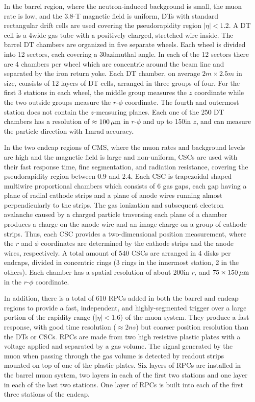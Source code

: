 In the barrel region, where the neutron-induced background is small, the muon rate is low, and the 3.8-T magnetic field is uniform, DTs with standard rectangular drift cells are used covering the pseudorapidity region $|\eta| < 1.2$. A DT cell is a 4\cm wide gas tube with a positively charged, stretched wire inside. 
The barrel DT chambers are organized in five separate wheels. Each wheel is divided into 12 sectors, each covering a 30\de azimuthal angle. In each of the 12 sectors there are 4 chambers per wheel which are concentric around the beam line and separated by the iron return yoke. Each DT chamber, on average $2\unit{m}\times2.5\unit{m}$ in size, consists of 12 layers of DT cells, arranged in three groups of four. For the first 3 stations in each wheel, the middle group measures the $z$ coordinate while the two outside groups measure the $r$-$\phi$ coordinate. The fourth and outermost station does not contain the $z$-measuring planes. Each one of the 250 DT chambers has a resolution of $\approx100\,\mu\text{m}$ in $r$-$\phi$ and up to 150\mum in $z$, and can measure the particle direction with 1\unit{mrad} accuracy.

In the two endcap regions of CMS, where the muon rates and background levels are high and the magnetic field is large and non-uniform, CSCs are used with their fast response time, fine segmentation, and radiation resistance, covering the pseudorapidity region between 0.9 and 2.4. 
Each CSC is trapezoidal shaped multiwire proportional chambers which consists of 6 gas gaps, each gap having a plane of radial cathode strips and a plane of anode wires running almost perpendicularly to the strips. The gas ionization and subsequent electron avalanche caused by a charged particle traversing each plane of a chamber produces a charge on the anode wire and an image charge on a group of cathode strips. Thus, each CSC provides a two-dimensional position measurement, where the $r$ and $\phi$ coordinates are determined by the cathode strips and the anode wires, respectively. A total amount of 540 CSCs are arranged in 4 disks per endcaps, divided in concentric rings (3 rings in the innermost station, 2 in the others). Each chamber has a spatial resolution of about 200\mm in $r$, and $75\times150\,\mu\text{m}$ in the $r$-$\phi$ coordinate.

In addition, there is a total of 610 RPCs added in both the barrel and endcap regions to provide a fast, independent, and highly-segmented trigger over a large portion of the rapidity range ($|\eta| < 1.6$) of the muon system. They produce a fast response, with good time resolution ($\approx2\unit{ns}$) but coarser position resolution than the DTs or CSCs. RPCs are made from two high resistive plastic plates with a voltage applied and separated by a gas volume. The signal generated by the muon when passing through the gas volume is detected by readout strips mounted on top of one of the plastic plates. Six layers of RPCs are installed in the barrel muon system, two layers in each of the first two stations and one layer in each of the last two stations. One layer of RPCs is built into each of the first three stations of the endcap.

